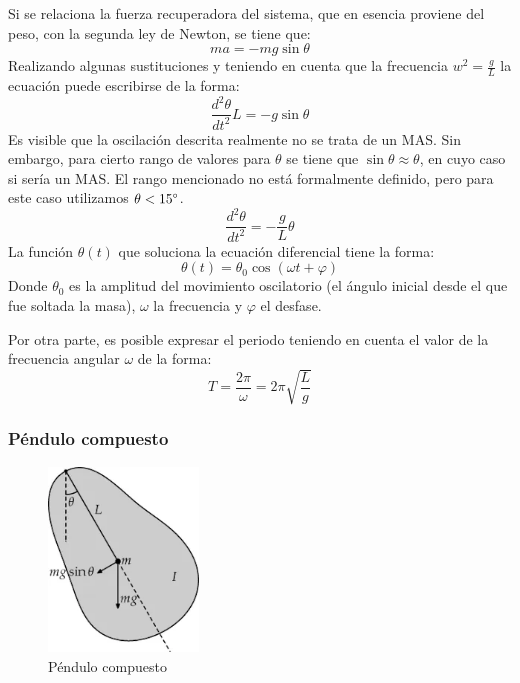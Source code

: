 \documentclass[spanish,notitlepage,letterpaper, 12pt]{article}
\begin{document}
Si se relaciona la fuerza recuperadora del sistema, que en esencia proviene del peso, con la segunda ley de Newton, se tiene que: 
\begin{equation}
    ma=-mg\sin{\theta}
\end{equation}
Realizando algunas sustituciones y teniendo en cuenta que la frecuencia $w^2=\frac{g}{L}$ la ecuación puede escribirse de la forma:
\begin{equation}
    \frac{d^2\theta}{dt^2}L=-g\sin{\theta}
\end{equation}
Es visible que la oscilación descrita realmente no se trata de un MAS. Sin embargo, para cierto rango de valores para $\theta$ se tiene que $\sin{\theta}\approx\theta$, en cuyo caso si sería un MAS. El rango mencionado no está formalmente definido, pero para este caso utilizamos $\theta<15\degree$.
\begin{equation}
    \frac{d^2\theta}{dt^2}=-\frac{g}{L}\theta
\end{equation}
La función $\theta(t)$ que soluciona la ecuación diferencial tiene la forma:
\begin{equation}
    \theta(t)=\theta_0\cos{(\omega t+\varphi)}
\end{equation}
Donde $\theta_0$ es la amplitud del movimiento oscilatorio (el ángulo inicial desde el que fue soltada la masa), $\omega$ la frecuencia y $\varphi$ el desfase. \cite{serway_jewett_2017} \par
\bigskip
Por otra parte, es posible expresar el periodo teniendo en cuenta el valor de la frecuencia angular $\omega$ de la forma:
\begin{equation}
    T=\frac{2\pi}{\omega}=2\pi\sqrt{\frac{L}{g}}
\end{equation}

\subsubsection{Péndulo compuesto}
 \cite{serway_jewett_2017} \par
\bigskip
\begin{figure}[ht]
    \centering
    \includegraphics[width=4.0cm]{images/Pendulo-compuesto.png}
    \caption{Péndulo compuesto}
    \label{Figura 2}
\end{figure}
\end{document}
